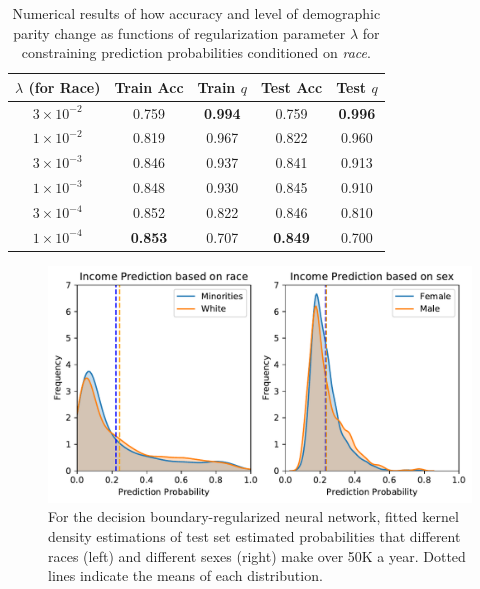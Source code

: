 \documentclass{article}
\begin{document}
\begin{table}[ht]
\centering
\begin{tabular}{c|cc |cc} 
 \hline
 \hline
 $\lambda$ (for Race) & Train Acc & Train $q$ & Test Acc & Test $q$ \\ 
 \hline
 $3 \times 10^{-2}$ & 0.759 & \textbf{0.994} & 0.759 & \textbf{0.996}\\
 $1 \times 10^{-2}$ &0.819 & 0.967 & 0.822 & 0.960\\
$3 \times 10^{-3}$ & 0.846 & 0.937 & 0.841 & 0.913\\
$1 \times 10^{-3}$ &0.848 &0.930 &  0.845 &0.910 \\
$3 \times 10^{-4}$ & 0.852 & 0.822 & 0.846 & 0.810\\
$1 \times 10^{-4}$ & \textbf{0.853} & 0.707 & \textbf{0.849} & 0.700\\
 \hline
\end{tabular}
\caption{Numerical results of how accuracy and level of demographic parity change as functions of regularization parameter $\lambda$ for constraining prediction probabilities conditioned on \emph{race}.}  \label{boundary-table-race}
\end{table}

\begin{figure}[ht]
\vskip 0.2in
\begin{center}
\centerline{\includegraphics[width=\columnwidth]{img/boundary-bias.pdf}}
\caption{For the decision boundary-regularized neural network, fitted kernel density estimations of test set estimated probabilities that different races (left) and different sexes (right) make over 50K a year.  Dotted lines indicate the means of each distribution.}
\label{boundary-bias}
\end{center}
\vskip -0.2in
\end{figure}
\end{document}
